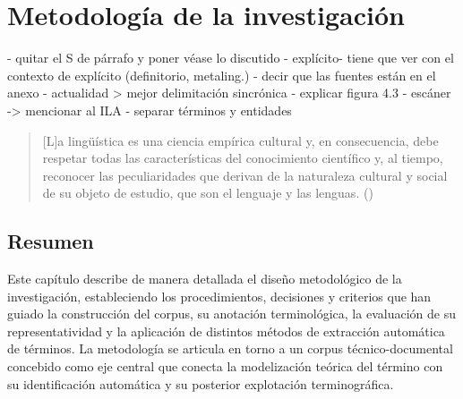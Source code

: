 
\renewcommand{\tablename}{Tabla}
\fontsize{14}{16}\selectfont

\chapter{Metodología de la investigación}
\label{chap:4_metodologia}

\makeatletter
\@afterindentfalse\@afterheading
\makeatother

- quitar el S de párrafo y poner véase lo discutido
- explícito- tiene que ver con el contexto de explícito (definitorio, metaling.)
- decir que las fuentes están en el anexo
- actualidad > mejor delimitación sincrónica
- explicar figura 4.3
- escáner -> mencionar al ILA
- separar términos y entidades

\setcounter{section}{0}
\renewcommand{\thesection}{\thechapter.\arabic{section}}

\fontsize{12}{14}\selectfont
\vspace{\baselineskip}

{}
\begin{quote}

    [L]a lingüística es una ciencia empírica cultural y, en consecuencia, debe respetar todas las características del conocimiento científico y, al tiempo, reconocer las peculiaridades que derivan de la naturaleza cultural y social de su objeto de estudio, que son el lenguaje y las lenguas. (\cite{rojo2021introduccion})
\end{quote}

{}
\fontsize{12}{14}\selectfont

\section{Resumen}

Este capítulo describe de manera detallada el diseño metodológico de la investigación, estableciendo los procedimientos, decisiones y criterios que han guiado la construcción del corpus, su anotación terminológica, la evaluación de su representatividad y la aplicación de distintos métodos de extracción automática de términos. La metodología se articula en torno a un corpus técnico-documental concebido como eje central que conecta la modelización teórica del término con su identificación automática y su posterior explotación terminográfica.

